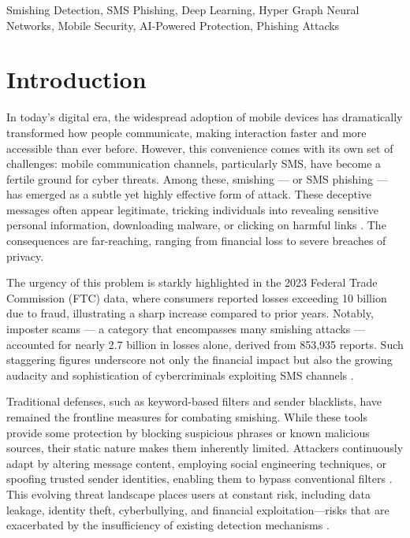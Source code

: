 \documentclass[conference]{IEEEtran}
\begin{document}
\begin{IEEEkeywords}
Smishing Detection, SMS Phishing, Deep Learning, Hyper Graph Neural Networks, Mobile Security, AI-Powered Protection, Phishing Attacks
\end{IEEEkeywords}

\section{Introduction}
\IEEEoverridecommandlockouts

In today’s digital era, the widespread adoption of mobile devices has dramatically transformed how people communicate, making interaction faster and more accessible than ever before. However, this convenience comes with its own set of challenges: mobile communication channels, particularly SMS, have become a fertile ground for cyber threats. Among these, smishing — or SMS phishing — has emerged as a subtle yet highly effective form of attack. These deceptive messages often appear legitimate, tricking individuals into revealing sensitive personal information, downloading malware, or clicking on harmful links \cite{ref1,ref7,ref11}. The consequences are far-reaching, ranging from financial loss to severe breaches of privacy.

The urgency of this problem is starkly highlighted in the 2023 Federal Trade Commission (FTC) data, where consumers reported losses exceeding 10 billion due to fraud, illustrating a sharp increase compared to prior years. Notably, imposter scams — a category that encompasses many smishing attacks — accounted for nearly 2.7 billion in losses alone, derived from 853,935 reports. Such staggering figures underscore not only the financial impact but also the growing audacity and sophistication of cybercriminals exploiting SMS channels \cite{ref3,ref6}. 

Traditional defenses, such as keyword-based filters and sender blacklists, have remained the frontline measures for combating smishing. While these tools provide some protection by blocking suspicious phrases or known malicious sources, their static nature makes them inherently limited. Attackers continuously adapt by altering message content, employing social engineering techniques, or spoofing trusted sender identities, enabling them to bypass conventional filters \cite{ref8,ref9}. This evolving threat landscape places users at constant risk, including data leakage, identity theft, cyberbullying, and financial exploitation—risks that are exacerbated by the insufficiency of existing detection mechanisms \cite{ref10,ref12}.
\end{document}
